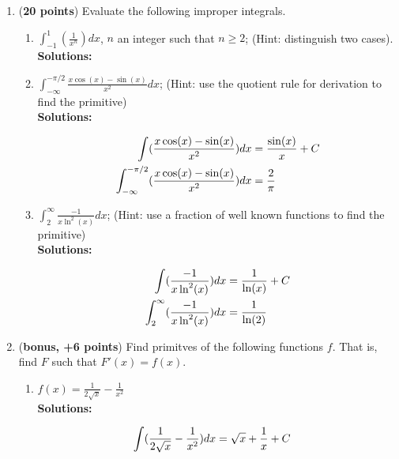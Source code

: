 \documentclass[a4paper]{article}
\begin{document}
\begin{enumerate}
\begin{enumerate}
\end{enumerate}


\item (\textbf{20 points}) Evaluate the following improper integrals.

\begin{enumerate}
	\item $\int_{-1}^1 (\frac{1}{x^n})dx$, $n$ an integer such that $n \geq 2$; (Hint: distinguish two cases).\\
	\textbf{Solutions:}	
	
	
	
	
	\item $\int_{-\infty}^{-\pi/2}\frac{x \cos(x) - \sin(x)}{x^2}dx$; (Hint: use the quotient rule for derivation to find the primitive)\\
	\textbf{Solutions:}	

\begin{align}
	\int(\frac{x \cos(x) - \sin(x)}{x^2})dx &= \frac{\sin(x)}{x} + C\notag\\
	\int_{-\infty}^{-\pi/2}(\frac{x \cos(x) - \sin(x)}{x^2})dx &= \frac{2}{\pi}\notag
\end{align}	


	\item $\int_{2}^{\infty}\frac{-1}{x \ln^2(x)} dx$; (Hint: use a fraction of well known functions to find the primitive)\\
	\textbf{Solutions:}	
	
\begin{align}
	\int(\frac{-1}{x \ln^2(x)})dx &= \frac{1}{\ln(x)} + C\notag\\
\int_{2}^{\infty}(\frac{-1}{x \ln^2(x)}) dx &= \frac{1}{\ln(2)}\notag
\end{align}	


\end{enumerate}


\item (\textbf{bonus, +6 points}) Find primitves of the following functions $f$. That is, find $F$ such that $F'(x) = f(x)$.

\begin{enumerate}
	\item $f(x) = \frac{1}{2 \sqrt{x}} - \frac{1}{x^2}$\\
	\textbf{Solutions:}		
	
\begin{align}
	\int(\frac{1}{2 \sqrt{x}} - \frac{1}{x^2})dx &= \sqrt{x} + \frac{1}{x} + C\notag
\end{align}		
	

\end{enumerate}
\end{enumerate}
\end{document}
